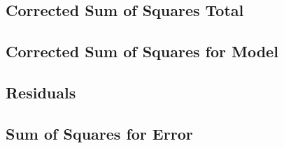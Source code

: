 \documentclass[
]{article}
\newenvironment{Shaded}{\begin{snugshade}}{\end{snugshade}}
\newcommand{\DecValTok}[1]{\textcolor[rgb]{0.00,0.00,0.81}{#1}}
\newcommand{\FunctionTok}[1]{\textcolor[rgb]{0.00,0.00,0.00}{#1}}
\newcommand{\NormalTok}[1]{#1}
\newcommand{\OtherTok}[1]{\textcolor[rgb]{0.56,0.35,0.01}{#1}}
\newcommand{\SpecialCharTok}[1]{\textcolor[rgb]{0.00,0.00,0.00}{#1}}
\begin{document}
\hypertarget{corrected-sum-of-squares-total}{%
\subsection{Corrected Sum of Squares
Total}\label{corrected-sum-of-squares-total}}

\begin{Shaded}
\end{Shaded}

\hypertarget{corrected-sum-of-squares-for-model}{%
\subsection{Corrected Sum of Squares for
Model}\label{corrected-sum-of-squares-for-model}}

\begin{Shaded}
\end{Shaded}

\hypertarget{residuals}{%
\subsection{Residuals}\label{residuals}}

\begin{Shaded}
\end{Shaded}

\hypertarget{sum-of-squares-for-error}{%
\subsection{Sum of Squares for Error}\label{sum-of-squares-for-error}}
\end{document}
